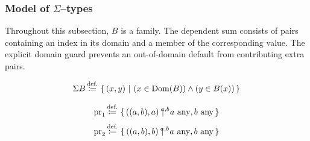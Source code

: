 \subsubsection{Model of $\Sigma$--types}
Throughout this subsection, $B$ is a family. The dependent sum consists
of pairs containing an index in its domain and a member of the
corresponding value. The explicit domain guard prevents an out-of-domain
default from contributing extra pairs.
\iffalse
\begin{definition}[dependent sum]

\[
\Sigma B \eqdef \cc{(a,b)}{(a\in\Dom(B))\land (b\in B(a)) }
\]
\end{definition}
\fi
\begin{definition}
\[
\Sigma B\,{\stackrel{{\textrm{def.}}}{\coloneqq}}\,\left\{\,(x,y)\ \middle|\ (x\in\mathrm{Dom}(B))\land(y\in B(x))\,\right\}
\]
\end{definition}
\begin{definition}
\[
\pr_1 \eqdef \ccc{a,b}{((a,b),a)}{\ a\any,b\any}
\]
\[
\pr_2 \eqdef \ccc{a,b}{((a,b),b)}{\ a\any,b\any}
\]
\end{definition}




